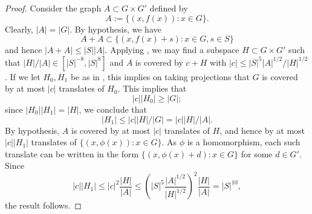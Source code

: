 \documentclass[10pt,a4paper]{article}
\newcommand{\uses}[1]{}
\newcommand{\leanok}{}
\begin{document}
\begin{proof}\uses{goursat, pfr-9-aux'}\leanok
Consider the graph $A \subset G \times G'$ defined by
$$ A := \{ (x,f(x)): x \in G \}.$$
Clearly, $|A| = |G|$.  By hypothesis, we have
$$ A+A \subset \{ (x,f(x)+s): x \in G, s \in S\}$$
and hence $|A+A| \leq |S| |A|$.  Applying , we may find a
subspace $H \subset G \times G'$ such that $|H|/ |A| \in [|S|^{-8}, |S|^{8}]$
and $A$ is covered by $c + H$ with $|c| \le |S|^5|A|^{1/2} / |H|^{1/2}$. If
we let $H_0, H_1$ be as in , this implies on taking projections
that $G$ is covered by at most $|c|$ translates of $H_0$. This implies that
$$ |c| |H_0| \geq |G|;$$
since $|H_0| |H_1| = |H|$, we conclude that
$$ |H_1| \leq |c| |H|/|G| = |c| |H|/|A|.$$
By hypothesis, $A$ is covered by at most $|c|$ translates of $H$, and hence
by at most $|c| |H_1|$ translates of $\{ (x,\phi(x)): x \in G \}$. As $\phi$
is a homomorphism, each such translate can be written in the form $\{
(x,\phi(x)+d): x \in G \}$ for some $d \in G'$. Since
$$
|c| |H_1| \le |c|^2 \frac{|H|}{|A|} \le \left(|S|^5 \frac{|A|^{1/2}}{|H|^{1/2}}\right)^2 \frac{|H|}{|A|}
= |S|^{10},
$$
the result follows.
\end{proof}
\end{document}
